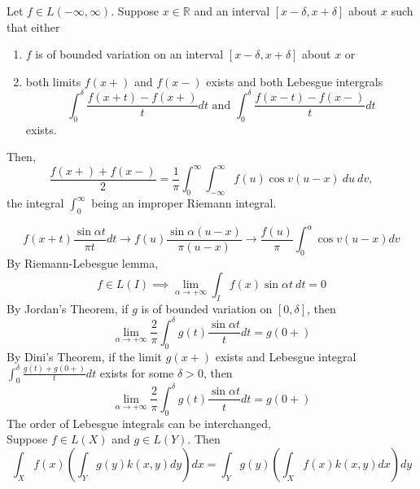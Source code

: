 \begin{theorem}
	Let \(f \in L(-\infty,\infty)\).
	Suppose \(x \in \mathbb{R}\) and an interval $[x-\delta,x+\delta]$ about $x$ such that either 
	\begin{enumerate}
		\item $f$ is of bounded variation on an interval $[x-\delta,x+\delta]$ about $x$ or
		\item both limits $f(x+)$ and $f(x-)$ exists and both Lebesgue intergrals
			\[ \int_0^\delta \frac{f(x+t)-f(x+)}{t} dt \text{ and }\int_0^\delta \frac{f(x-t)-f(x-)}{t} dt \]
			exists.
	\end{enumerate}
	Then, 
	\[ \frac{f(x+)+f(x-)}{2} = \frac{1}{\pi} \int_0^\infty \int_{-\infty}^\infty f(u)\cos v(u-x)\ du\ dv, \]
	the integral $\int_0^\infty$ being an improper Riemann integral.
\end{theorem}
\begin{synopsis}
	\[ f(x+t)\frac{\sin \alpha t}{\pi t} dt \to f(u)\frac{\sin \alpha(u-x)}{\pi(u-x)} \to \frac{f(u)}{\pi} \int_0^\alpha \cos v(u-x) dv \]
	By Riemann-Lebesgue lemma\cite[Theorem 11.6]{apostol},
	\[ f \in L(I) \implies \lim_{\alpha \to +\infty} \int_I f(x) \sin \alpha t\ dt = 0 \]
	By Jordan's Theorem\cite[Theorem 10.8]{apostol}, if $g$ is of bounded variation on $[0,\delta]$, then
	\[ \lim_{\alpha \to +\infty} \frac{2}{\pi} \int_0^\delta g(t) \frac{\sin \alpha t}{t} dt = g(0+) \]
	By Dini's Theorem\cite[Theorem 10.9]{apostol}, if the limit $g(x+)$ exists and Lebesgue integral \( \int_0^\delta \frac{g(t)+g(0+)}{t} dt \) exists for some \( \delta > 0 \), then
	\[ \lim_{\alpha \to +\infty} \frac{2}{\pi} \int_0^\delta g(t) \frac{\sin \alpha t}{t} dt = g(0+) \]
	The order of Lebesgue integrals can be interchanged\cite[Theorem 10.40]{apostol},\\
	Suppose \(f \in L(X)\) and \(g \in L(Y)\).
	Then
	\[ \int_X f(x) \left(\int_Y g(y) k(x,y) dy \right) dx = \int_Y g(y) \left( \int_X f(x) k(x,y) dx \right) dy \]
\end{synopsis}
